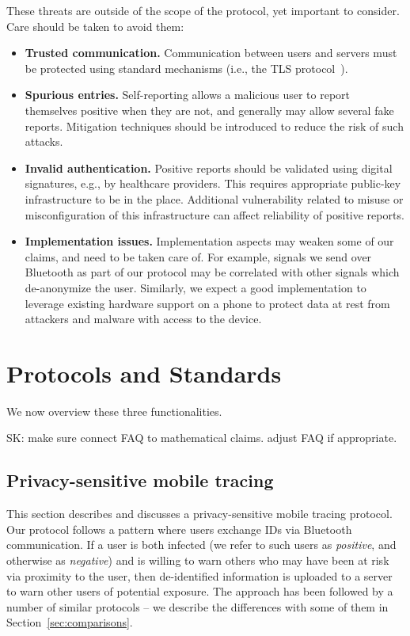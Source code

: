 \documentclass{article}
\newcommand{\sk}[1]{\textsf{\color{magenta} SK: #1}}
\begin{document}
These threats are outside of the scope of the protocol, yet important to consider. Care should be taken to avoid them:
\begin{itemize}
    \item {\bf Trusted communication.} Communication between users and servers must be protected using standard mechanisms (i.e., the TLS protocol~\cite{TLS}).
    \item {\bf Spurious entries.} Self-reporting allows a malicious user to report themselves positive when they are not, and generally may allow several fake reports. Mitigation techniques should be introduced to reduce the risk of such attacks.  
    \item {\bf Invalid authentication.} Positive reports should be validated using digital signatures, e.g., by healthcare providers. This requires appropriate public-key infrastructure to be in the place. Additional vulnerability related to misuse or misconfiguration of this infrastructure can affect reliability of positive reports.
    \item {\bf Implementation issues.} Implementation aspects may weaken some of our claims, and need to be taken care of. For example, signals we send over Bluetooth as part of our protocol may be correlated with other signals which de-anonymize the user. Similarly, we expect a good implementation to leverage existing hardware support on a phone to protect data at rest from attackers and malware with access to the device.
   
    
\end{itemize}

\section{Protocols and Standards} 
We now overview these three functionalities.

\sk{make sure connect FAQ to mathematical claims. adjust FAQ if appropriate.}

\subsection{Privacy-sensitive mobile tracing} \label{sect:Bluetooth}

This section describes and discusses a privacy-sensitive mobile tracing protocol. Our protocol follows a pattern where users exchange IDs via Bluetooth communication.   If a user is both infected (we refer to such users as {\em positive}, and otherwise as {\em negative}) and is willing to warn others who may have been at risk via proximity to the user, then de-identified information is uploaded to a server to warn other users of potential exposure. The approach has been followed by a number of similar protocols -- we describe the differences with some of them in Section~\ref{sec:comparisons}.
\end{document}
